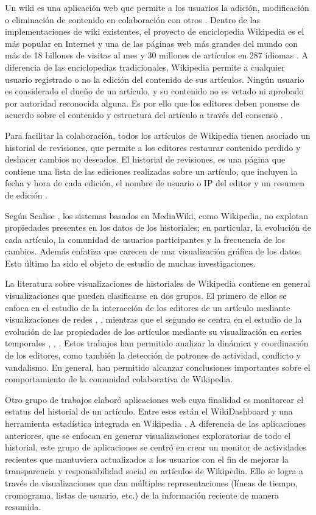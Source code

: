 Un wiki es una aplicación web que permite a los usuarios la adición, modificación o eliminación de contenido en colaboración con otros \cite{Wiki}. Dentro de las implementaciones de wiki existentes, el proyecto de enciclopedia Wikipedia es el más popular en Internet y una de las páginas web más grandes del mundo con más de 18 billones de visitas al mes y 30 millones de artículos en 287 idiomas \cite{Wikipedia}.
A diferencia de las enciclopedias tradicionales, Wikipedia permite a cualquier usuario registrado o no la edición del contenido de sus artículos. Ningún usuario es considerado el dueño de un artículo, y su contenido no es vetado ni aprobado por autoridad reconocida alguna. Es por ello que los editores deben ponerse de acuerdo sobre el contenido y estructura del artículo a través del consenso \cite{Wikipedia}.

Para facilitar la colaboración, todos los artículos de Wikipedia tienen asociado un historial de revisiones, que permite a los editores restaurar contenido perdido y deshacer cambios no deseados. El historial de revisiones, es una página que contiene una lista de las ediciones realizadas sobre un artículo, que incluyen la fecha y hora de cada edición, el nombre de usuario o IP del editor y un resumen de edición \cite{WikiHelp}.

Según Scalise \cite{Sca08}, los sistemas basados en MediaWiki, como Wikipedia, no explotan propiedades presentes en los datos de los historiales; en particular, la evolución de cada artículo, la comunidad de usuarios participantes y la frecuencia de los cambios. Además enfatiza que carecen de una visualización gráfica de los datos. Esto último ha sido el objeto de estudio de muchas investigaciones.

La literatura sobre visualizaciones de historiales de Wikipedia contiene en general visualizaciones que pueden clasificarse en dos grupos. El primero de ellos se enfoca en el estudio de la interacción de los editores de un artículo mediante visualizaciones de redes \cite{Suh07}, \cite{Kee12}, mientras que el segundo se centra en el estudio de la evolución de las propiedades de los artículos mediante su visualización en series temporales \cite{Vie04}, \cite{Wat07}, \cite{Nun08}. Estos trabajos han permitido analizar la dinámica y coordinación de los editores, como también la detección de patrones de actividad, conflicto y vandalismo. En general, han permitido alcanzar conclusiones importantes sobre el comportamiento de la comunidad colaborativa de Wikipedia.

Otro grupo de trabajos elaboró aplicaciones web cuya finalidad es monitorear el estatus del historial de un artículo. Entre esos están el WikiDashboard \cite{Suh08} y una herramienta estadística integrada en Wikipedia \cite{Aka}. A diferencia de las aplicaciones anteriores, que se enfocan en generar visualizaciones exploratorias de todo el historial, este grupo de aplicaciones se centró en crear un monitor de actividades recientes que mantuviera actualizados a los usuarios con el fin de mejorar la transparencia y responsabilidad social en artículos de Wikipedia. Ello se logra a través de visualizaciones que dan múltiples representaciones (líneas de tiempo, cromograma, listas de usuario, etc.) de la información reciente de manera resumida.

